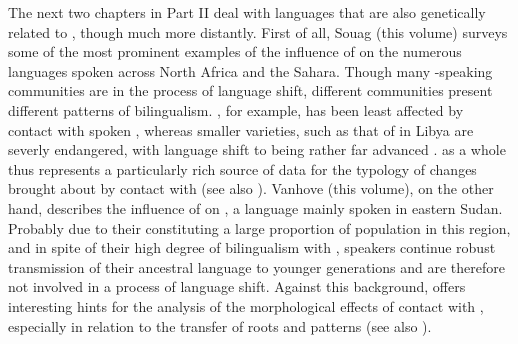 \documentclass[output=paper]{langsci/langscibook}
\begin{document}
The next two chapters in Part II deal with languages that are also genetically related to , though much more distantly. First of all, Souag (this volume) surveys some of the most prominent examples of the influence of  on the numerous  languages spoken across North Africa and the Sahara. Though many -speaking communities are in the process of {language shift}, different communities present different patterns of {bilingualism}. , for example, has been least affected by contact with spoken , whereas smaller varieties, such as that of  in Libya are severly {endangered}, with {language shift} to  being rather far advanced \citep{vanPuttenSouag2015}.  as a whole thus represents a particularly rich source of data for the typology of changes brought about by contact with  (see also \citealt{Kossmann2013book}). Vanhove (this volume), on the other hand, describes the influence of  on , a   language mainly spoken in eastern Sudan. Probably due to their constituting a large proportion of population in this region, and in spite of their high degree of {bilingualism} with  ,  speakers continue robust {transmission} of their ancestral language to younger generations and are therefore not involved in a process of {language shift}. Against this background,  offers interesting hints for the analysis of the morphological effects of contact with , especially in relation to the {transfer} of {roots} and patterns (see also \citealt{Vanhove2012}).
\end{document}
